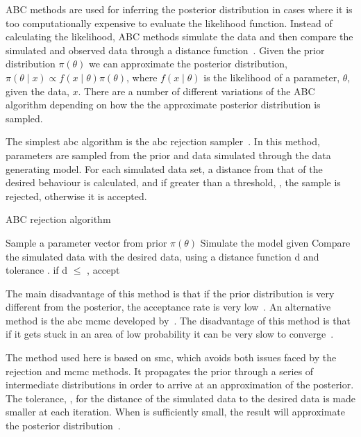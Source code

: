 ABC methods are used for inferring the posterior distribution in cases where it is too computationally expensive to evaluate the likelihood function. Instead of calculating the likelihood, ABC methods simulate the data and then compare the simulated and observed data through a distance function~\autocite{Toni:2009tr}. Given the prior distribution $\pi(\theta)$ we can approximate the posterior distribution, $\pi(\theta\mid x)\propto f(x\mid\theta)\pi(\theta)$, where $f(x\mid\theta)$ is the likelihood of a parameter, $\theta$, given the data, $x$. There are a number of different variations of the ABC algorithm depending on how the the approximate posterior distribution is sampled. 

The simplest \acrshort{abc} algorithm is the \acrshort{abc} rejection sampler~\autocite{Pritchard:1999td}. In this method, parameters are sampled from the prior and data simulated through the data generating model. For each simulated data set, a distance from that of the desired behaviour is calculated, and if greater than a threshold, \textepsilon{}, the sample is rejected, otherwise it is accepted. 
\begin{algorithm}[H]

  \caption{ABC rejection algorithm}
 	\label{alg:ABC}
 \begin{algorithmic}[1]
    \Statex
	\State Sample a parameter vector \texttheta{} from prior $\pi(\theta)$
	\State Simulate the model given \texttheta{}
    \State Compare the simulated data with the desired data, using a distance function d and tolerance \textepsilon{}. if d $\leq$ \textepsilon{}, accept \texttheta{} 
   
  \end{algorithmic}
\end{algorithm}


\noindent The main disadvantage of this method is that if the prior distribution is very different from the posterior, the acceptance rate is very low~\autocite{Toni:2009tr}. An alternative method is the \acrshort{abc} \acrfull{mcmc} developed by~\textcite{Marjoram:2003up}. The disadvantage of this method is that if it gets stuck in an area of low probability it can be very slow to converge~\autocite{Sisson:wf}. 

The method used here is based on \acrlong{smc}, which avoids both issues faced by the rejection and \acrshort{mcmc} methods. It propagates the prior through a series of intermediate distributions in order to arrive at an approximation of the posterior. The tolerance, \textepsilon{}, for the distance of the simulated data to the desired data is made smaller at each iteration. When \textepsilon{} is sufficiently small, the result will approximate the posterior distribution~\autocite{Toni:2009tr}.  

